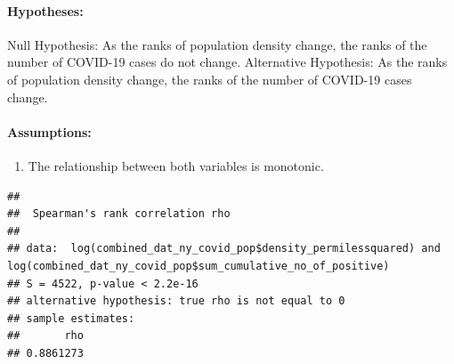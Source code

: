 \documentclass[
  12pt,
]{article}
\newenvironment{Shaded}{\begin{snugshade}}{\end{snugshade}}
\newcommand{\AttributeTok}[1]{\textcolor[rgb]{0.77,0.63,0.00}{#1}}
\newcommand{\CommentTok}[1]{\textcolor[rgb]{0.56,0.35,0.01}{\textit{#1}}}
\newcommand{\FunctionTok}[1]{\textcolor[rgb]{0.00,0.00,0.00}{#1}}
\newcommand{\NormalTok}[1]{#1}
\newcommand{\OtherTok}[1]{\textcolor[rgb]{0.56,0.35,0.01}{#1}}
\newcommand{\SpecialCharTok}[1]{\textcolor[rgb]{0.00,0.00,0.00}{#1}}
\newcommand{\StringTok}[1]{\textcolor[rgb]{0.31,0.60,0.02}{#1}}
\providecommand{\tightlist}{%
  \setlength{\itemsep}{0pt}\setlength{\parskip}{0pt}}
\begin{document}
\hypertarget{hypotheses-1}{%
\paragraph{Hypotheses:}\label{hypotheses-1}}

Null Hypothesis: As the ranks of population density change, the ranks of
the number of COVID-19 cases do not change. Alternative Hypothesis: As
the ranks of population density change, the ranks of the number of
COVID-19 cases change.

\hypertarget{assumptions-1}{%
\paragraph{Assumptions:}\label{assumptions-1}}

\begin{enumerate}
\def\labelenumi{\arabic{enumi}.}
\tightlist
\item
  The relationship between both variables is monotonic.
\end{enumerate}

\begin{Shaded}
\end{Shaded}

\begin{verbatim}
## 
##  Spearman's rank correlation rho
## 
## data:  log(combined_dat_ny_covid_pop$density_permilessquared) and log(combined_dat_ny_covid_pop$sum_cumulative_no_of_positive)
## S = 4522, p-value < 2.2e-16
## alternative hypothesis: true rho is not equal to 0
## sample estimates:
##       rho 
## 0.8861273
\end{verbatim}
\end{document}
